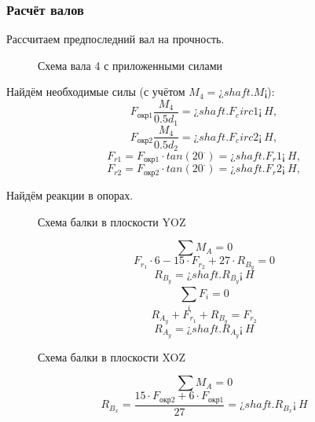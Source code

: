 \documentclass[14pt,a4paper,russian]{scrartcl}
\begin{document}
    \subsubsection{Расчёт валов}
        Рассчитаем предпоследний вал на прочность. 
        \begin{figure}[h]
            \caption{Схема вала 4 с приложенными силами}
        \end{figure}
        Найдём необходимые силы (с учётом \( M_4 = ¿shaft.M¡ \)):
        \[ F_{\text{окр1}} \frac{M_4}{0.5d_1} = ¿shaft.F_circ1¡\ H,\]
        \[ F_{\text{окр2}} \frac{M_4}{0.5d_2} = ¿shaft.F_circ2¡\ H,\]
        \[ F_{r1} = F_{\text{окр1}}\cdot tan(20^\cdot) = ¿shaft.F_r1¡\ H,\]
        \[ F_{r2} = F_{\text{окр2}}\cdot tan(20^\cdot) = ¿shaft.F_r2¡\ H,\]

        Найдём реакции в опорах.\par
        \begin{figure}[h]
            \caption{Схема балки в плоскости YOZ}
        \end{figure}
        \[ \sum M_A = 0 \]
        \[ F_{r_1}\cdot 6 - 15\cdot F_{r_2} + 27\cdot R_{B_y} = 0\]
        \[ R_{B_y} = ¿shaft.R_B_y¡\ H\]
        \[ \sum_{i}^{}F_i = 0 \]
        \[ R_{A_y} + F_{r_1} + R_{B_y} = F_{r_2} \]
        \[ R_{A_y} = ¿shaft.R_A_y¡\ H\]        
        
        \begin{figure}[h]
            \caption{Схема балки в плоскости XOZ}
        \end{figure}
        \[ \sum M_A = 0 \]
        \[ R_{B_x} = \frac{15\cdot F_{\text{окр2}} + 6\cdot F_{\text{окр1}}}{27} = ¿shaft.R_B_x¡\ H\]
        
\end{document}
